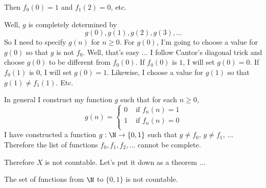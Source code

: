 Then $f_0(0) = 1$ and $f_1(2) = 0$, etc.

Well, $g$ is completely determined by 
\[
g(0), g(1), g(2), g(3), ...
\]
So I need to specify $g(n)$ for $n \geq 0$.
For $g(0)$, I'm going to choose a value for $g(0)$ so that 
$g$ is not $f_0$.
Well, that's easy ... I follow Cantor's diagonal trick
and choose $g(0)$ to be different from $f_0(0)$.
If $f_0(0)$ is $1$, I will set $g(0) = 0$.
If $f_0(1)$ is $0$, I will set $g(0) = 1$.
Likewise, I choose a value for $g(1)$ so that $g(1) \neq f_1(1)$.
Etc.

In general I construct my function $g$ such that
for each $n \geq 0$,
\[
g(n)
= 
\begin{cases}
0 & \text{ if } f_n(n) = 1 \\
1 & \text{ if } f_n(n) = 0 \\
\end{cases}
\]
I have constructed a function $g : \N \rightarrow \{0, 1\}$
such that $g \neq f_0$, $g \neq f_1$, ...
Therefore the list of functions $f_0, f_1, f_2, \ldots$ cannot be 
complete.

Therefore $X$ is not countable.
Let's put it down as a theorem ...

\begin{thm}
The set of functions from $\N$ to $\{0,1\}$ is not countable.
\end{thm}






